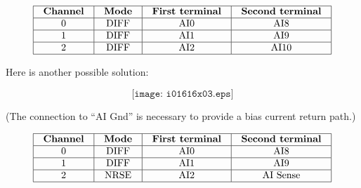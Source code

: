 
$$\vbox{\offinterlineskip
\halign{\strut
\vrule \quad\hfil # \ \hfil & 
\vrule \quad\hfil # \ \hfil & 
\vrule \quad\hfil # \ \hfil & 
\vrule \quad\hfil # \ \hfil \vrule \cr
\noalign{\hrule}
%
{\bf Channel} & {\bf Mode} & {\bf First terminal} & {\bf Second terminal} \cr
%
\noalign{\hrule}
%
0 & DIFF & AI0 & AI8 \cr
%
\noalign{\hrule}
%
1 & DIFF & AI1 & AI9 \cr
%
\noalign{\hrule}
%
2 & DIFF & AI2 & AI10 \cr
%
\noalign{\hrule}
} %
}$$ %

\vfil \eject

Here is another possible solution:

$$\texttt{[image: i01616x03.eps]}$$

(The connection to ``AI Gnd'' is necessary to provide a bias current return path.)


$$\vbox{\offinterlineskip
\halign{\strut
\vrule \quad\hfil # \ \hfil & 
\vrule \quad\hfil # \ \hfil & 
\vrule \quad\hfil # \ \hfil & 
\vrule \quad\hfil # \ \hfil \vrule \cr
\noalign{\hrule}
%
{\bf Channel} & {\bf Mode} & {\bf First terminal} & {\bf Second terminal} \cr
%
\noalign{\hrule}
%
0 & DIFF & AI0 & AI8 \cr
%
\noalign{\hrule}
%
1 & DIFF & AI1 & AI9 \cr
%
\noalign{\hrule}
%
2 & NRSE & AI2 & AI Sense \cr
%
\noalign{\hrule}
} %
}$$ %




